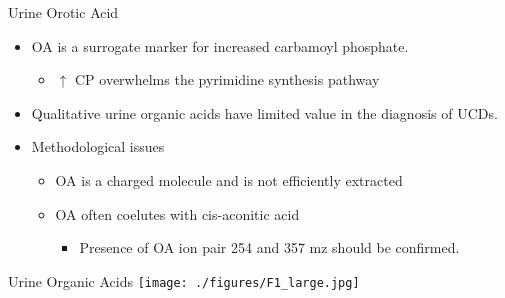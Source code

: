 \documentclass[presentation, smaller]{beamer}
\begin{document}
\begin{frame}[label={sec:orgheadline14}]{Urine Orotic Acid}
\begin{itemize}
\item OA is a surrogate marker for increased carbamoyl phosphate.
\begin{itemize}
\item \(\uparrow\) CP overwhelms the pyrimidine synthesis pathway
\end{itemize}
\end{itemize}

\begin{block}{}
\centering
{}
\end{block}

\begin{itemize}
\item Qualitative urine organic acids have limited value in the diagnosis of UCDs.
\item Methodological issues
\begin{itemize}
\item OA is a charged molecule and is not efficiently extracted
\item OA often coelutes with cis-aconitic acid
\begin{itemize}
\item Presence of OA ion pair 254 and 357 mz should be confirmed.
\end{itemize}
\end{itemize}
\end{itemize}
\end{frame}

\begin{frame}[label={sec:orgheadline15}]{Urine Organic Acids}
\centering
\texttt{[image: ./figures/F1\_large.jpg]}
\end{frame}
\end{document}
